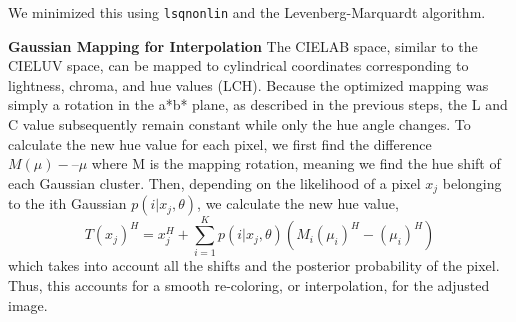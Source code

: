 \documentclass[10pt,twocolumn,letterpaper]{article}
\begin{document}
We minimized this using \texttt{lsqnonlin} and the Levenberg-Marquardt algorithm. 

\textbf{Gaussian Mapping for Interpolation}
The CIELAB space, similar to the CIELUV space, can be mapped to cylindrical coordinates corresponding to lightness, chroma, and hue values (LCH). Because the optimized mapping was simply a rotation in the a*b* plane, as described in the previous steps, the L and C value subsequently remain constant while only the hue angle changes. To calculate the new hue value for each pixel, we first find the difference $M(\mu) -– \mu$ where M is the mapping rotation, meaning we find the hue shift of each Gaussian cluster. Then, depending on the likelihood of a pixel $x_j$ belonging to the ith Gaussian $p(i|x_j, \theta)$, we calculate the new hue value, 
\[
  T(x_j)^{H} = x_j^{H} + \sum\limits_{i=1}^K p(i|x_j, \theta)(M_i(\mu_i)^{H}-(\mu_i)^{H})
\]
which takes into account all the shifts and the posterior probability of the pixel.  Thus, this accounts for a smooth re-coloring, or interpolation, for the adjusted image. 
\end{document}
